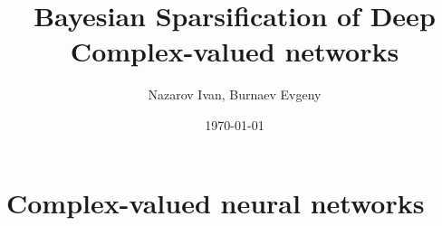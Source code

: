 \documentclass{beamer}
\title[Exam]{Bayesian Sparsification of Deep Complex-valued networks}
\author[Nazarov I., Burnaev E.]{Nazarov Ivan, Burnaev Evgeny}
\date{\today}
\institute[Skoltech]{Skolkovo Institute of Science and Technology}
\newcommand{\cplx}{\mathbb{C}}
\begin{document}
\begin{frame}
  \titlepage
\end{frame}


\section{Complex-valued neural networks} %
\label{sec:complex_valued_networks}
\end{document}
